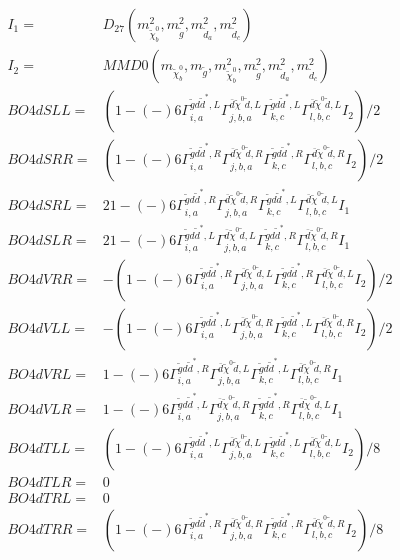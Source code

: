 \documentclass[A4,landscape]{article}
\begin{document}
\begin{align} 
I_1 = & D_{27}(m^2_{\tilde{\chi}^0_{{b}}}, m^2_{\tilde{g}}, m^2_{\tilde{d}_{{a}}}, m^2_{\tilde{d}_{{c}}}) \\ 
I_2 = & MMD0(m_{\tilde{\chi}^0_{{b}}}, m_{\tilde{g}}, m^2_{\tilde{\chi}^0_{{b}}}, m^2_{\tilde{g}}, m^2_{\tilde{d}_{{a}}}, m^2_{\tilde{d}_{{c}}}) \\ 
  BO4dSLL= & (  1
-(-)
  6 \Gamma^{\tilde{g} d \tilde{d}^*,L}_{i, a} \Gamma^{\bar{d}\tilde{\chi}^0 \tilde{d} ,L}_{j, b, a} \Gamma^{\tilde{g} d \tilde{d}^*,L}_{k, c} \Gamma^{\bar{d}\tilde{\chi}^0 \tilde{d} ,L}_{l, b, c} I_2)/2 \\ 
  BO4dSRR= & (  1
-(-)
  6 \Gamma^{\tilde{g} d \tilde{d}^*,R}_{i, a} \Gamma^{\bar{d}\tilde{\chi}^0 \tilde{d} ,R}_{j, b, a} \Gamma^{\tilde{g} d \tilde{d}^*,R}_{k, c} \Gamma^{\bar{d}\tilde{\chi}^0 \tilde{d} ,R}_{l, b, c} I_2)/2 \\ 
  BO4dSRL= & 2   1
-(-)
  6 \Gamma^{\tilde{g} d \tilde{d}^*,R}_{i, a} \Gamma^{\bar{d}\tilde{\chi}^0 \tilde{d} ,R}_{j, b, a} \Gamma^{\tilde{g} d \tilde{d}^*,L}_{k, c} \Gamma^{\bar{d}\tilde{\chi}^0 \tilde{d} ,L}_{l, b, c} I_1 \\ 
  BO4dSLR= & 2   1
-(-)
  6 \Gamma^{\tilde{g} d \tilde{d}^*,L}_{i, a} \Gamma^{\bar{d}\tilde{\chi}^0 \tilde{d} ,L}_{j, b, a} \Gamma^{\tilde{g} d \tilde{d}^*,R}_{k, c} \Gamma^{\bar{d}\tilde{\chi}^0 \tilde{d} ,R}_{l, b, c} I_1 \\ 
  BO4dVRR= & -(  1
-(-)
  6 \Gamma^{\tilde{g} d \tilde{d}^*,R}_{i, a} \Gamma^{\bar{d}\tilde{\chi}^0 \tilde{d} ,L}_{j, b, a} \Gamma^{\tilde{g} d \tilde{d}^*,R}_{k, c} \Gamma^{\bar{d}\tilde{\chi}^0 \tilde{d} ,L}_{l, b, c} I_2)/2 \\ 
  BO4dVLL= & -(  1
-(-)
  6 \Gamma^{\tilde{g} d \tilde{d}^*,L}_{i, a} \Gamma^{\bar{d}\tilde{\chi}^0 \tilde{d} ,R}_{j, b, a} \Gamma^{\tilde{g} d \tilde{d}^*,L}_{k, c} \Gamma^{\bar{d}\tilde{\chi}^0 \tilde{d} ,R}_{l, b, c} I_2)/2 \\ 
  BO4dVRL= &   1
-(-)
  6 \Gamma^{\tilde{g} d \tilde{d}^*,R}_{i, a} \Gamma^{\bar{d}\tilde{\chi}^0 \tilde{d} ,L}_{j, b, a} \Gamma^{\tilde{g} d \tilde{d}^*,L}_{k, c} \Gamma^{\bar{d}\tilde{\chi}^0 \tilde{d} ,R}_{l, b, c} I_1 \\ 
  BO4dVLR= &   1
-(-)
  6 \Gamma^{\tilde{g} d \tilde{d}^*,L}_{i, a} \Gamma^{\bar{d}\tilde{\chi}^0 \tilde{d} ,R}_{j, b, a} \Gamma^{\tilde{g} d \tilde{d}^*,R}_{k, c} \Gamma^{\bar{d}\tilde{\chi}^0 \tilde{d} ,L}_{l, b, c} I_1 \\ 
  BO4dTLL= & (  1
-(-)
  6 \Gamma^{\tilde{g} d \tilde{d}^*,L}_{i, a} \Gamma^{\bar{d}\tilde{\chi}^0 \tilde{d} ,L}_{j, b, a} \Gamma^{\tilde{g} d \tilde{d}^*,L}_{k, c} \Gamma^{\bar{d}\tilde{\chi}^0 \tilde{d} ,L}_{l, b, c} I_2)/8 \\ 
  BO4dTLR= & 0 \\ 
  BO4dTRL= & 0 \\ 
  BO4dTRR= & (  1
-(-)
  6 \Gamma^{\tilde{g} d \tilde{d}^*,R}_{i, a} \Gamma^{\bar{d}\tilde{\chi}^0 \tilde{d} ,R}_{j, b, a} \Gamma^{\tilde{g} d \tilde{d}^*,R}_{k, c} \Gamma^{\bar{d}\tilde{\chi}^0 \tilde{d} ,R}_{l, b, c} I_2)/8 \\ 
\end{align} 
\end{document}
